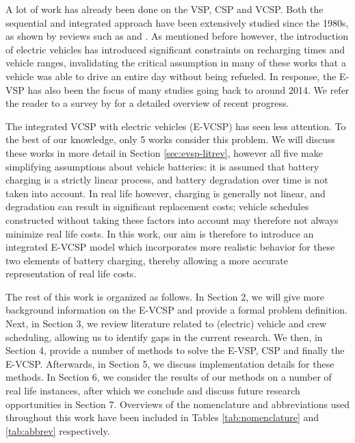 \documentclass[]{article}
\begin{document}
\noindent A lot of work has already been done on the VSP, CSP and VCSP. Both the sequential and integrated approach have been extensively studied since the 1980s, as shown by reviews such as \citet{Ibarra-Rojas2015} and \citet{Ge2024}. As mentioned before however, the introduction of electric vehicles has introduced significant constraints on recharging times and vehicle ranges, invalidating the critical assumption in many of these works that a vehicle was able to drive an entire day without being refueled. In response, the E-VSP has also been the focus of many studies going back to around 2014. We refer the reader to a survey by \citet{Perumal2022LitRev} for a detailed overview of recent progress.

The integrated VCSP with electric vehicles (E-VCSP) has seen less attention. To the best of our knowledge, only 5 works consider this problem. We will discuss these works in more detail in Section \ref{sec:evsp-litrev}, however all five make simplifying assumptions about vehicle batteries: it is assumed that battery charging is a strictly linear process, and battery degradation over time is not taken into account. In real life however, charging is generally not linear, and degradation can result in significant replacement costs; vehicle schedules constructed without taking these factors into account may therefore not always minimize real life costs. In this work, our aim is therefore to introduce an integrated E-VCSP model which incorporates more realistic behavior for these two elements of battery charging, thereby allowing a more accurate representation of real life costs.

The rest of this work is organized as follows. In Section 2, we will give more background information on the E-VCSP and provide a formal problem definition. Next, in Section 3, we review literature related to (electric) vehicle and crew scheduling, allowing us to identify gaps in the current research. We then, in Section 4, provide a number of methods to solve the E-VSP, CSP and finally the E-VCSP. Afterwards, in Section 5, we discuss implementation details for these methods. In Section 6, we consider the results of our methods on a number of real life instances, after which we conclude and discuss future research opportunities in Section 7. Overviews of the nomenclature and abbreviations used throughout this work have been included in Tables \ref{tab:nomenclature} and \ref{tab:abbrev} respectively.
\end{document}
